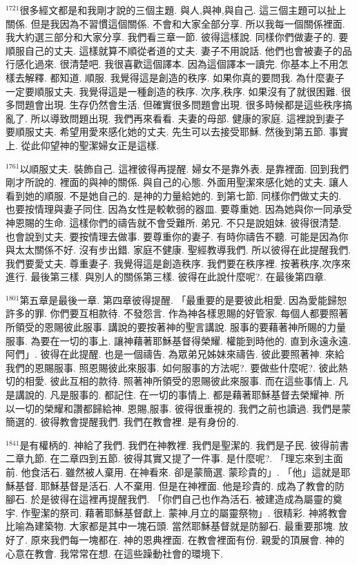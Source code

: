 \documentclass{book}
\begin{document}
$^{1721}$很多經文都是和我剛才說的三個主題.
與人,與神,與自己.
這三個主題可以扯上關係.
但是我因為不習慣這個關係.
不會和大家全部分享.
所以我每一個關係裡面.
我大約選三部分和大家分享.
我們看三章一節.
彼得這樣說.
同樣你們做妻子的.
要順服自己的丈夫.
這樣就算不順從者道的丈夫.
妻子不用說話.
他們也會被妻子的品行感化過來.
很清楚吧.
我很喜歡這個譯本.
因為這個譯本一讀完.
你基本上不用怎樣去解釋.
都知道.
順服.
我覺得這是創造的秩序.
如果你真的要問我.
為什麼妻子一定要順服丈夫.
我覺得這是一種創造的秩序.
次序,秩序.
如果沒有了就很困難.
很多問題會出現.
生存仍然會生活.
但確實很多問題會出現.
很多時候都是這些秩序搞亂了.
所以導致問題出現.
我們再來看看.
夫妻的母部.
健康的家庭.
這裡說到妻子要順服丈夫.
希望用愛來感化她的丈夫.
先生可以去接受耶穌.
然後到第五節.
事實上.
從此仰望神的聖潔婦女正是這樣.

$^{1761}$以順服丈夫.
裝飾自己.
這裡彼得再提醒.
婦女不是靠外表.
是靠裡面.
回到我們剛才所說的.
裡面的與神的關係.
與自己的心態.
外面用聖潔來感化她的丈夫.
讓人看到她的順服.
不是她自己的.
是神的力量給她的.
到第七節.
同樣你們做丈夫的.
也要按情理與妻子同住.
因為女性是較軟弱的器皿.
要尊重她.
因為她與你一同承受神恩賜的生命.
這樣你們的禱告就不會受難所.
弟兄.
不只是說姐妹.
彼得很清楚.
也會說到丈夫.
要按情理去做事.
要尊重你的妻子.
有時你禱告不聽.
可能是因為你與太太關係不好.
沒有步出錯.
家庭不健康.
聖經教導我們.
所以彼得在此提醒我們.
我們要愛丈夫.
尊重妻子.
我覺得這是創造秩序.
我們要在秩序裡.
按著秩序,次序來進行.
最後第三樣.
與別人的關係第三樣.
彼得在此說什麼呢?.
在最後第四章.

$^{1801}$第五章是最後一章.
第四章彼得提醒.
「最重要的是要彼此相愛.
因為愛能歸恕許多的罪.
你們要互相款待.
不發怨言.
作為神各樣恩賜的好管家.
每個人都要照著所領受的恩賜彼此服事.
講說的要按著神的聖言講說.
服事的要藉著神所賜的力量服事.
為要在一切的事上.
讓神藉著耶穌基督得榮耀.
權能到時他的.
直到永遠永遠.
阿們」.
彼得在此提醒.
也是一個禱告.
為眾弟兄姊妹來禱告.
彼此要照著神.
來給我們的恩賜服事.
照恩賜彼此來服事.
如何服事的方法呢?.
要做些什麼呢?.
彼此熱切的相愛.
彼此互相的款待.
照著神所領受的恩賜彼此來服事.
而在這些事情上.
凡是講說的.
凡是服事的.
都記住.
在一切的事情上.
都是藉著耶穌基督去榮耀神.
所以一切的榮耀和讚都歸給神.
恩賜,服事.
彼得很重視的.
我們之前也讀過.
我們是蒙簡選的.
彼得教會提醒我們.
我們在教會裡.
是有身份的.

$^{1841}$是有權柄的.
神給了我們.
我們在神教裡.
我們是聖潔的.
我們是子民.
彼得前書二章九節.
在二章四到五節.
彼得其實又提了一件事.
是什麼呢?.
「理忘來到主面前.
他食活石.
雖然被人棄用.
在神看來.
卻是蒙簡選.
蒙珍貴的」.
「他」這就是耶穌基督.
耶穌基督是活石.
人不棄用.
但是在神裡面.
他是珍貴的.
成為了教會的防腳石.
於是彼得在這裡再提醒我們.
「你們自己也作為活石.
被建造成為屬靈的奠宇.
作聖潔的祭司.
藉著耶穌基督獻上.
蒙神,月立的屬靈祭物」.
很精彩.
神將教會比喻為建築物.
大家都是其中一塊石頭.
當然耶穌基督就是防腳石.
最重要那塊.
放好了.
原來我們每一塊都在.
神的恩典裡面.
在教會裡面有份.
親愛的頂展會.
神的心意在教會.
我常常在想.
在這些躁動社會的環境下.
\end{document}
